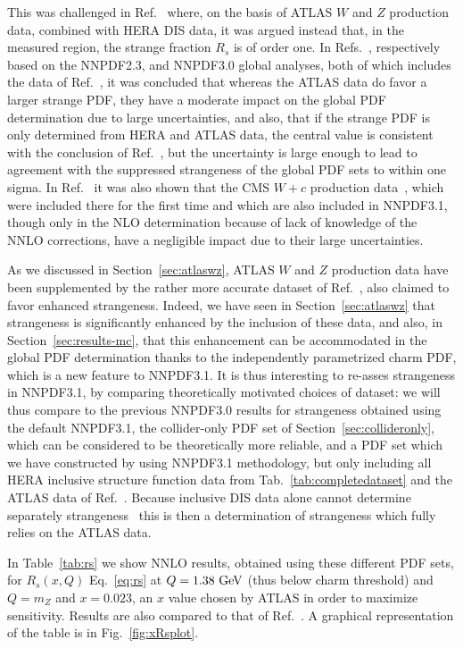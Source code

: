 This was challenged in Ref.~\cite{Aad:2012sb} where, on the
basis of ATLAS $W$ and $Z$ production data, combined with HERA DIS
data, 
it was argued instead that,
in the measured region, the strange fraction $R_s$ is of order one. In
Refs.~\cite{Ball:2012cx,Ball:2015oha}, respectively based on the
NNPDF2.3, and NNPDF3.0 global analyses, both of which
includes the data of Ref.~\cite{Aad:2012sb}, it was concluded that
whereas the ATLAS data do favor a larger strange PDF, they have a moderate
impact on the global PDF determination 
due to large uncertainties, and also, that if
the strange PDF is only determined from HERA and ATLAS data, the
central value is consistent with the conclusion of
Ref.~\cite{Aad:2012sb}, but the uncertainty is large enough to lead to
agreement with the suppressed strangeness of the global PDF sets to within
one sigma. In Ref.~\cite{Ball:2015oha} it was also shown that the CMS
$W+c$ production data~\cite{Chatrchyan:2013uja}, which were included
there for the first time and which are also included in NNPDF3.1, 
though only in the NLO
determination because of lack of knowledge of the NNLO corrections,
have a negligible impact due to their large uncertainties. 

As we discussed in Section~\ref{sec:atlaswz},  ATLAS $W$ and $Z$
production data have been supplemented by the rather more accurate
dataset of Ref.~\cite{Aaboud:2016btc}, also claimed to 
favor enhanced strangeness. Indeed, we have seen in
Section~\ref{sec:atlaswz} that strangeness is significantly enhanced by
the inclusion of these data, and also, in Section~\ref{sec:results-mc},
that this enhancement  can be accommodated in the global PDF
determination 
thanks to the independently parametrized  charm PDF, which is a new
feature to NNPDF3.1.
It is thus interesting to re-asses strangeness in NNPDF3.1, by
comparing theoretically motivated choices of dataset: we will thus compare
to the
previous NNPDF3.0 results for strangeness obtained using the default
NNPDF3.1, the 
collider-only PDF set of Section~\ref{sec:collideronly}, which can be
considered to be theoretically more reliable, and a PDF set which we
have constructed by using NNPDF3.1 methodology, but only including all
HERA inclusive structure function data from
Tab.~\ref{tab:completedataset} and the ATLAS data of
Ref.~\cite{Aaboud:2016btc}. Because inclusive DIS data alone cannot
determine separately strangeness~\cite{Forte:2010dt} this is then a
determination of strangeness which fully relies on the ATLAS data.

In Table~\ref{tab:rs}  we show NNLO
results, obtained using these different PDF sets,
 for $R_s(x,Q)$ Eq.~\ref{eq:rs} at
 $Q=1.38~{\rm GeV}$ (thus below charm threshold) and $Q=m_Z$ and
$x=0.023$, an $x$ value chosen by ATLAS in order to maximize
sensitivity. Results are also compared to that of
Ref.~\cite{Aaboud:2016btc}.
A graphical representation of the table is in Fig.~\ref{fig:xRsplot}.

